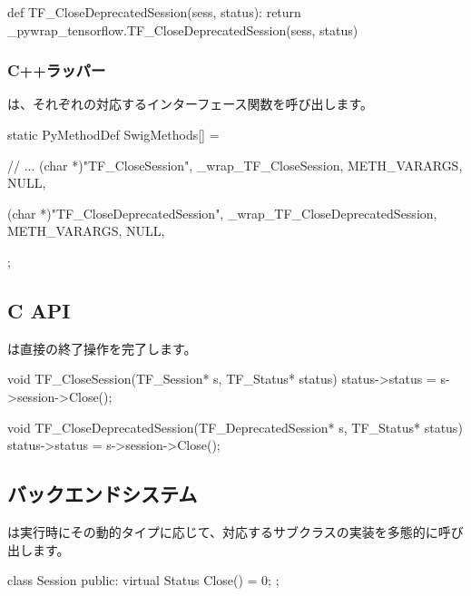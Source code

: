 \begin{content}
\begin{leftbar}
\begin{python}[caption={tensorflow/bazel-bin/tensorflow/python/pywrap\_tensorflow\_internal.py}]
def TF_CloseDeprecatedSession(sess, status):
  return _pywrap_tensorflow.TF_CloseDeprecatedSession(sess, status)
\end{python}
\end{leftbar}

\subsubsection{C++ラッパー}

は、それぞれの対応するインターフェース関数を呼び出します。

\begin{leftbar}
\begin{c++}[caption={tensorflow/bazel-bin/tensorflow/python/pywrap\_tensorflow\_internal.cc}]
static PyMethodDef SwigMethods[] = {
  // ...
  { (char *)"TF_CloseSession", 
    _wrap_TF_CloseSession, METH_VARARGS, NULL},

  { (char *)"TF_CloseDeprecatedSession", 
    _wrap_TF_CloseDeprecatedSession, METH_VARARGS, NULL},
};
\end{c++}
\end{leftbar}

\subsection{C API}

は直接の終了操作を完了します。

\begin{leftbar}
\begin{c++}[caption={tensorflow/c/c\_api.c}]
void TF_CloseSession(TF_Session* s, TF_Status* status) {
  status->status = s->session->Close();
}

void TF_CloseDeprecatedSession(TF_DeprecatedSession* s, TF_Status* status) {
  status->status = s->session->Close();
}
\end{c++}
\end{leftbar}

\subsection{バックエンドシステム}

は実行時にその動的タイプに応じて、対応するサブクラスの実装を多態的に呼び出します。

\begin{leftbar}
\begin{c++}[caption={tensorflow/core/common\_runtime/session.h}]
class Session {
public:
  virtual Status Close() = 0;
};
\end{c++}
\end{leftbar}

\end{content}

